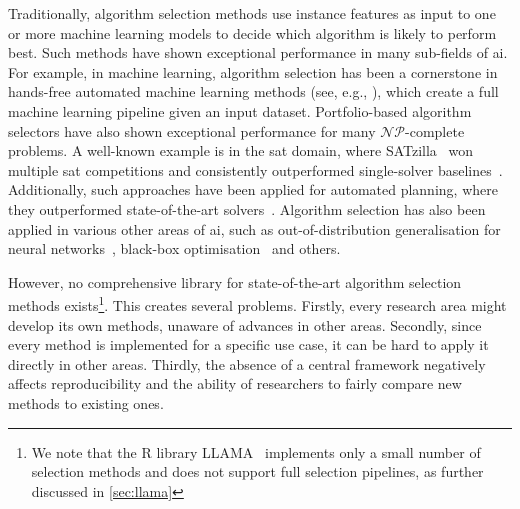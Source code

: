 Traditionally, algorithm selection methods use instance features as input to one or more machine learning models to decide which algorithm is likely to perform best.
Such methods have shown exceptional performance in many sub-fields of \gls{ai}.
For example, in machine learning, algorithm selection has been a cornerstone in hands-free automated machine learning methods (see, e.g., \citealp{FeuEtAl15}), which create a full machine learning pipeline given an input dataset.
Portfolio-based algorithm selectors have also shown exceptional performance for many $\mathcal{NP}$-complete problems. A well-known example is in the \gls{sat} domain, where SATzilla~\citep{XuEtAl08} won multiple \gls{sat} competitions and consistently outperformed single-solver baselines~\citep{XuEtAl12,ShaHoo24}. Additionally, such approaches have been applied for automated planning, where they outperformed state-of-the-art solvers~\citep{ValEtAl14}.
Algorithm selection has also been applied in various other areas of \gls{ai}, such as out-of-distribution generalisation for neural networks~\citep{JiaEtAl25}, black-box optimisation~\citep{JonEtAl98} and others.

However, no comprehensive library for state-of-the-art algorithm selection methods exists\footnote{We note that the R library LLAMA~\citep{Kotthoff13} implements only a small number of selection methods and does not support full selection pipelines, as further discussed in \autoref{sec:llama}}. This creates several problems.
Firstly, every research area might develop its own methods, unaware of advances in other areas.
Secondly, since every method is implemented for a specific use case, it can be hard to apply it directly in other areas.
Thirdly, the absence of a central framework negatively affects reproducibility and the ability of researchers to fairly compare new methods to existing ones.

